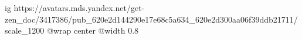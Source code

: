  
 
 
 
 

\ifcmt
  ig https://avatars.mds.yandex.net/get-zen_doc/3417386/pub_620e2d144290e17e68c5a634_620e2d300aa06f39ddb21711/scale_1200
  @wrap center
  @width 0.8
\fi
